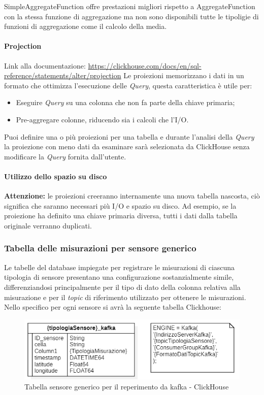 SimpleAggregateFunction offre prestazioni migliori rispetto a AggregateFunction con la stessa funzione di aggregazione ma non sono disponibili tutte le tipoligie di funzioni di aggregazione come il calcolo della media.


    
\paragraph{Projection}\label{sec:projections}
Link alla documentazione: \href{https://clickhouse.com/docs/en/sql-reference/statements/alter/projection}{https://clickhouse.com/docs/en/sql-reference/statements/alter/projection}\newline
Le proiezioni memorizzano i dati in un formato che ottimizza l'esecuzione delle \textit{Query}, questa caratteristica è utile per:

\begin{itemize}
    \item Eseguire \textit{Query} su una colonna che non fa parte della chiave primaria;
    \item Pre-aggregare colonne, riducendo sia i calcoli che l'I/O.
\end{itemize}

Puoi definire una o più proiezioni per una tabella e durante l'analisi della \textit{Query} la proiezione con meno dati da esaminare sarà selezionata da ClickHouse senza modificare la \textit{Query} fornita dall'utente.

\paragraph*{Utilizzo dello spazio su disco}
\textbf{Attenzione:} le proiezioni creeranno internamente una nuova tabella nascosta, ciò significa che saranno necessari più I/O e spazio su disco. Ad esempio, se la proiezione ha definito una chiave primaria diversa, tutti i dati dalla tabella originale verranno duplicati.

\subsubsection{Tabella delle misurazioni per sensore generico}
Le tabelle del database impiegate per registrare le misurazioni di ciascuna tipologia di sensore presentano una configurazione sostanzialmente simile, differenziandosi principalmente per il tipo di dato della colonna relativa alla misurazione e per il \textit{topic} di riferimento utilizzato per ottenere le misurazioni.
Nello specifico per ogni sensore si avrà la seguente tabella Clickhouse:
\begin{figure}[H]
    \centering
    \includegraphics[width=.6\textwidth]{../Images/SpecificaTecnica/sensorType_kafka.PNG}
    \caption{Tabella sensore generico per il reperimento da kafka - ClickHouse}
    \label{fig:sensorKafka}
  \end{figure}

